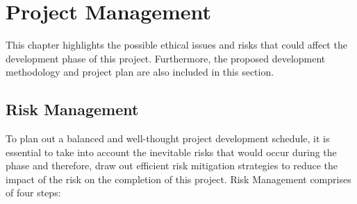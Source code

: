 
\chapter{Project Management} %

\label{Project Management} %


This chapter highlights the possible ethical issues and risks that could affect the 
development phase of this project. Furthermore, the proposed development methodology and 
project plan are also included in this section.

\section{Risk Management}
To plan out a balanced and well-thought project development schedule, it is essential 
to take into account the inevitable risks that would occur during the phase and therefore, draw out 
efficient risk mitigation strategies to reduce the impact of the risk on the completion 
of this project. Risk Management comprises of four steps:

